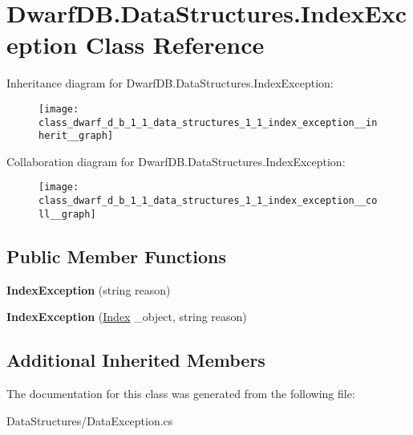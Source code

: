 \hypertarget{class_dwarf_d_b_1_1_data_structures_1_1_index_exception}{\section{Dwarf\+D\+B.\+Data\+Structures.\+Index\+Exception Class Reference}
\label{class_dwarf_d_b_1_1_data_structures_1_1_index_exception}
}


Inheritance diagram for Dwarf\+D\+B.\+Data\+Structures.\+Index\+Exception\+:\nopagebreak
\begin{figure}[H]
\begin{center}
\leavevmode
\texttt{[image: class\_dwarf\_d\_b\_1\_1\_data\_structures\_1\_1\_index\_exception\_\_inherit\_\_graph]}
\end{center}
\end{figure}


Collaboration diagram for Dwarf\+D\+B.\+Data\+Structures.\+Index\+Exception\+:\nopagebreak
\begin{figure}[H]
\begin{center}
\leavevmode
\texttt{[image: class\_dwarf\_d\_b\_1\_1\_data\_structures\_1\_1\_index\_exception\_\_coll\_\_graph]}
\end{center}
\end{figure}
\subsection*{Public Member Functions}
\begin{DoxyCompactItemize}
\item 
\hypertarget{class_dwarf_d_b_1_1_data_structures_1_1_index_exception_aee03e81543a53f20ddcca303c79018ad}{{\bfseries Index\+Exception} (string reason)}\label{class_dwarf_d_b_1_1_data_structures_1_1_index_exception_aee03e81543a53f20ddcca303c79018ad}

\item 
\hypertarget{class_dwarf_d_b_1_1_data_structures_1_1_index_exception_a2c9bcab774735ac2406f852f55647d46}{{\bfseries Index\+Exception} (\hyperlink{class_dwarf_d_b_1_1_data_structures_1_1_index}{Index} \+\_\+object, string reason)}\label{class_dwarf_d_b_1_1_data_structures_1_1_index_exception_a2c9bcab774735ac2406f852f55647d46}

\end{DoxyCompactItemize}
\subsection*{Additional Inherited Members}


The documentation for this class was generated from the following file\+:\begin{DoxyCompactItemize}
\item 
Data\+Structures/Data\+Exception.\+cs\end{DoxyCompactItemize}
